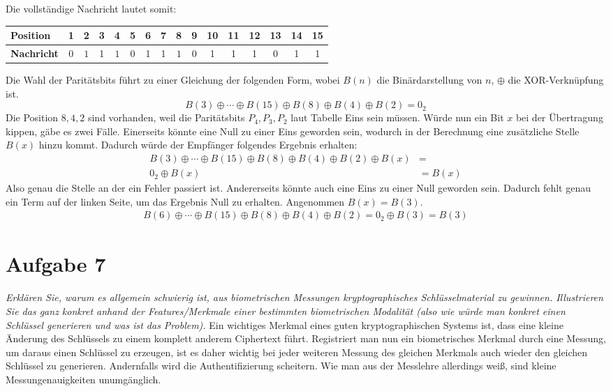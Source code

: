 \documentclass{article}
\begin{document}
    Die vollständige Nachricht lautet somit:
    \begin{center}
        \begin{tabular}{l|ccccccccccccccc}
            \textbf{Position} & 1 & 2 & 3 & 4 &5&6&7&8&9&10&11&12&13&14&15\\\hline
            \textbf{Nachricht} & $0$ & $1$ & 1 & $1$ &0&1&1&$1$& 0 & 1 & 1& 1 &0 & 1 & 1
        \end{tabular}
    \end{center}
    Die Wahl der Paritätsbits führt zu einer Gleichung der folgenden Form, wobei $B(n)$ die Binärdarstellung
    von $n$, $\oplus$ die XOR-Verknüpfung ist.
    \[
        B(3) \oplus \cdots\oplus B(15) \oplus B(8) \oplus B(4) \oplus B(2) = 0_2
    \]
    Die Position $8, 4, 2$ sind vorhanden, weil die Paritätsbits $P_4, P_3, P_2$ laut Tabelle Eins sein müssen.
    Würde nun ein Bit $x$ bei der Übertragung kippen, gäbe es zwei Fälle. Einerseits könnte eine Null zu einer Eins geworden
    sein, wodurch in der Berechnung eine zusätzliche Stelle $B(x)$ hinzu kommt. Dadurch würde der Empfänger folgendes
    Ergebnis erhalten:
    \begin{align*}
        B(3) \oplus \cdots\oplus B(15) \oplus B(8) \oplus B(4) \oplus B(2)\oplus B(x) &=\\
        0_2 \oplus B(x) &= B(x)
    \end{align*}
    Also genau die Stelle an der ein Fehler passiert ist. Andererseits könnte auch eine Eins zu einer Null geworden
    sein. Dadurch fehlt genau ein Term auf der linken Seite, um das Ergebnis Null zu erhalten. Angenommen $B(x) = B(3)$. 
    \begin{align*}
        B(6) \oplus \cdots\oplus B(15) \oplus B(8) \oplus B(4) \oplus B(2) = 0_2 \oplus B(3) = B(3)
    \end{align*}
    \section{Aufgabe 7}
    \textit{Erklären Sie, warum es allgemein schwierig ist, aus biometrischen Messungen kryptographisches 
    Schlüsselmaterial zu gewinnen. Illustrieren Sie das ganz konkret anhand der Features/Merkmale
    einer bestimmten biometrischen Modalität (also wie würde man konkret einen Schlüssel
    generieren und was ist das Problem).}\vspace*{1em}\newline
    Ein wichtiges Merkmal eines guten kryptographischen Systems ist, dass eine kleine Änderung des Schlüssels
    zu einem komplett anderem Ciphertext führt. Registriert man nun ein biometrisches Merkmal durch eine Messung, 
    um daraus einen  Schlüssel zu erzeugen, ist es daher wichtig bei jeder weiteren Messung des gleichen Merkmals 
    auch wieder den gleichen Schlüssel zu generieren. Andernfalls wird die Authentifizierung scheitern. Wie man
    aus der Messlehre allerdings weiß, sind kleine Messungenauigkeiten unumgänglich.
\end{document}
